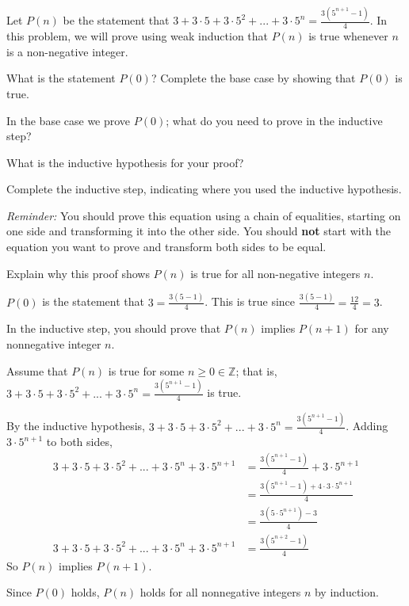 \documentclass[12pt]{exam}
\newcommand{\ints}{\mathbb{Z}}
\begin{document}
 Let $P(n)$ be the statement that $3 + 3 \cdot 5 + 3 \cdot 5^2 + ... + 3 \cdot 5^n = \frac{3 (5^{n+1} - 1)}{4}$. In this problem, we will prove using weak induction that $P(n)$ is true whenever $n$ is a non-negative integer.
\begin{parts}
    \item What is the statement $P(0)$? Complete the base case by showing that $P(0)$ is true.
    \item In the base case we prove $P(0)$; what do you need to prove in the inductive step?
    \item What is the inductive hypothesis for your proof?
    \item Complete the inductive step, indicating where you used the inductive hypothesis.
    
    \textit{Reminder:} You should prove this equation using a chain of equalities, starting on one side and transforming it into the other side.  You should \textbf{not} start with the equation you want to prove and transform both sides to be equal.
    \item Explain why this proof shows $P(n)$ is true for all non-negative integers $n$.
\end{parts}

\begin{solution}
    \begin{parts}
        \item $P(0)$ is the statement that $3 = \frac{3(5-1)}{4}$. This is true since $\frac{3(5-1)}{4} = \frac{12}{4} = 3$.
        \item In the inductive step, you should prove that $P(n)$ implies $P(n+1)$ for any nonnegative integer $n$.
        \item Assume that $P(n)$ is true for some $n \geq 0 \in \ints$; that is, $3 + 3 \cdot 5 + 3 \cdot 5^2 + ... + 3 \cdot 5^n = \frac{3 (5^{n+1} - 1)}{4}$ is true.
        \item By the inductive hypothesis, $3 + 3 \cdot 5 + 3 \cdot 5^2 + ... + 3 \cdot 5^n = \frac{3 (5^{n+1} - 1)}{4}$. Adding $3 \cdot 5^{n+1}$ to both sides, 
        \begin{align*}
            3 + 3 \cdot 5 + 3 \cdot 5^2 + ... + 3 \cdot 5^n + 3 \cdot 5^{n+1} &= \frac{3 (5^{n+1} - 1)}{4} + 3 \cdot 5^{n+1} \\
            &=\frac{3 (5^{n+1} - 1) + 4 \cdot 3 \cdot 5^{n+1}}{4} \\
            &=\frac{3 ( 5 \cdot 5^{n+1}) - 3}{4} \\
            3 + 3 \cdot 5 + 3 \cdot 5^2 + ... + 3 \cdot 5^n + 3 \cdot 5^{n+1} &=\frac{3 ( 5^{n+2} - 1)}{4}
        \end{align*}
        So $P(n)$ implies $P(n+1)$. 
        \item Since $P(0)$ holds, $P(n)$ holds for all nonnegative integers $n$ by induction.
    \end{parts}
\end{solution}
\end{document}
